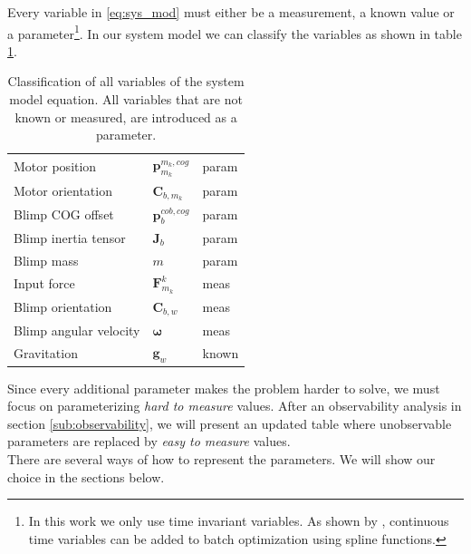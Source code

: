 Every variable in \eqref{eq:sys_mod} must either be a measurement, a known value or a parameter\footnote{In this work we only use time invariant variables.
As shown by \citet{Furgale2012}, continuous time variables can be added to batch optimization using spline functions.}. 
In our system model we can classify the variables as shown in table \ref{tab:params}.

\begin{table}[htb!]
\label{tab:params}
\centering
\begin{tabular}{lll}
\hline
Motor position & $\mathbf{p}^{m_k,cog}_{m_k}$ & param \\
Motor orientation & $\mathbf{C}_{b,m_k}$ & param \\
Blimp COG offset & $\mathbf{p}^{cob,cog}_b$ & param \\
Blimp inertia tensor & $\mathbf{J}_b$ & param \\
Blimp mass & $m$ & param \\
Input force & $\mathbf{F}_{m_k}^k$ & meas \\
Blimp orientation & $\mathbf{C}_{b,w}$ & meas \\
Blimp angular velocity & $\boldsymbol{\omega}$ & meas \\
Gravitation & $\mathbf{g}_w$ & known \\
\hline
\end{tabular}
\caption{Classification of all variables of the system model equation. All variables that are not known or measured, are introduced as a parameter.}
\end{table}

Since every additional parameter makes the problem harder to solve, we must focus on parameterizing \textit{hard to measure} values.
After an observability analysis in section \ref{sub:observability}, we will present an updated table where unobservable parameters are replaced by \textit{easy to measure} values.
\\

There are several ways of how to represent the parameters.
We will show our choice in the sections below.

